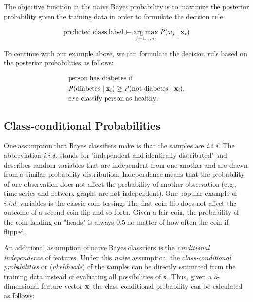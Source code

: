 \documentclass{article}
\begin{document}
The objective function in the naive Bayes probability is to maximize the posterior probability given the training data in order to formulate the decision rule. 

\begin{equation} \text{predicted class label} \leftarrow \underset{j = 1 ..., m} {\text{arg max}} \; P(\omega_{j} \mid \textbf x_i)   \end{equation}

To continue with our example above, we can formulate the decision rule based on the posterior probabilities as follows:

\begin{equation} 
\begin{split} 
   & \text{person has diabetes if} \\
   & P(\text{diabetes} \mid \textbf x_i) \ge P(\text{not-diabetes} \mid \textbf x_i), \\
   & \text{else classify person as healthy}.
\end{split}
   \end{equation}




\subsection{Class-conditional Probabilities}
\label{sec:class-conditional_probabilities_1}

One assumption that Bayes classifiers make is that the samples are \emph{i.i.d.}  
The abbreviation \emph{i.i.d.} stands for "independent and identically distributed" and describes random variables that are independent from one another and are drawn from a similar probability distribution. Independence means that the probability of one observation does not affect the probability of another observation (e.g., time series and network graphs are not independent).  One popular example of  \emph{i.i.d.} variables is the classic coin tossing: The first coin flip does not affect the outcome of a second coin flip and so forth. Given a fair coin, the probability of the coin landing on "heads" is always 0.5 no matter of how often the coin if flipped.

An additional assumption of naive Bayes classifiers is the \emph{conditional independence} of features. Under this \emph{naive} assumption, the \emph{class-conditional probabilities} or (\emph{likelihoods}) of the samples can be directly estimated from the training data instead of evaluating all possibilities of \textbf{x}. Thus, given a $d$-dimensional feature vector \textbf{x}, the class conditional probability can be calculated as follows:
\end{document}
